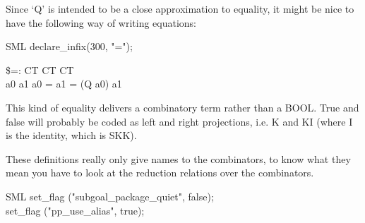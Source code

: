 Since `Q' is intended to be a close approximation to equality, it might be nice to have the following way of writing equations:

\begin{GFT}{SML}
\+declare\_infix(300, "=");\\
\end{GFT}


\begin{HOLConst}
\+\PrNM{} \$\PrNL{}=\PrNN{}: CT \MMM{\rightarrow} CT \MMM{\rightarrow} CT\\
\PrPH{}\PrPM{}\PrPM{}\PrPM{}\PrPM{}\PrPM{}\PrPM{}\PrPM{}\PrPM{}\PrPM{}\PrPM{}\PrPM{}
\+\PrNM{} \MMM{\forall}a0 a1\MMM{\bullet} a0 = a1 = (Q  a0)  a1\\
\end{HOLConst}

This kind of equality delivers a combinatory term rather than a BOOL.
True and false will probably be coded as left and right projections, i.e. K and KI (where I is the identity, which is SKK).

These definitions really only give names to the combinators, to know what they mean you have to look at the reduction relations over the combinators.

\begin{GFT}{SML}
\+set\_flag ("subgoal\_package\_quiet", false);\\
\+set\_flag ("pp\_use\_alias", true);\\
\end{GFT}



